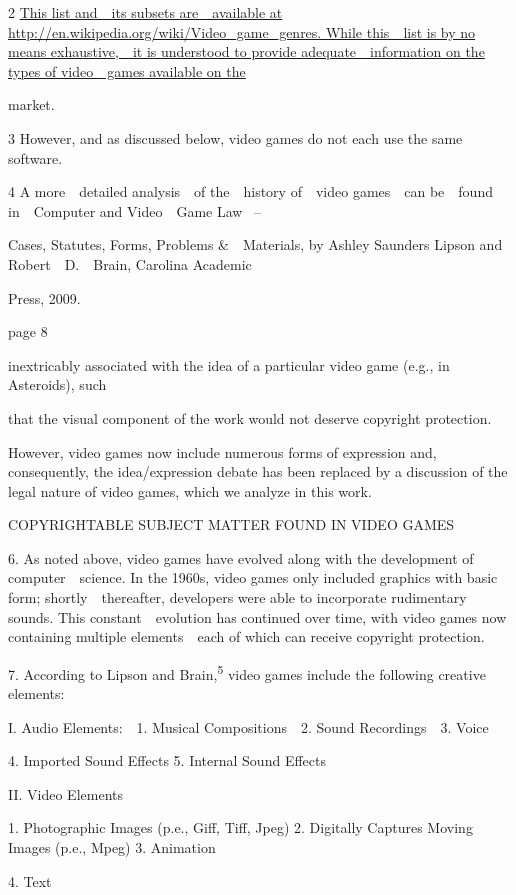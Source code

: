 \documentclass[
]{article}
\begin{document}
{2 }\href{http://en.wikipedia.org/wiki/Video_game_genres}{{This list
and~~its subsets are~~available at
http://en.wikipedia.org/wiki/Video\_game\_genres. While this~~list is by
no means exhaustive,~~it is understood to provide adequate~~information
on the types of video~~games available on the}}

{market.}

{3 }{However, and as discussed below, video games do not each use the
same software.}

{4 }{A more~~detailed analysis~~of the~~history of~~video games~~can
be~~found in~~}{Computer and Video~~Game Law }{~--}

{Cases, Statutes, Forms, Problems \&~~Materials}{, by Ashley Saunders
Lipson and Robert~~D.~~Brain, Carolina Academic}

{Press, 2009.}

{page 8}

{inextricably associated with the idea of a particular video game (e.g.,
in }{Asteroids}{), such}

{that the visual component of the work would not deserve copyright
protection.}

{However, video games now include numerous forms of expression and,
consequently, the idea/expression debate has been replaced by a
discussion of the legal nature of video games, which we analyze in this
work.}

{COPYRIGHTABLE SUBJECT MATTER FOUND IN VIDEO GAMES}

{6. }{As noted above, video games have evolved along with the
development of computer~~science. In the 1960s, video games only
included graphics with basic form; shortly~~thereafter, developers were
able to incorporate rudimentary sounds. This constant~~evolution has
continued over time, with video games now containing multiple
elements~~each of which can receive copyright protection.}

{7. }{According to Lipson and Brain,}\textsuperscript{{5 }}{video games
include the following creative elements:}

{I. Audio Elements:~~1. Musical Compositions~~2. Sound Recordings~~3.
Voice}

{4. Imported Sound Effects 5. Internal Sound Effects}

{II. Video Elements}

{1. Photographic Images (p.e., Giff, Tiff, Jpeg) 2. Digitally Captures
Moving Images (p.e., Mpeg) 3. Animation}

{4. Text}
\end{document}
